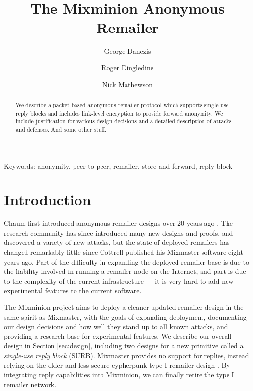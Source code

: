 \documentclass{llncs}
\begin{document}


\title{The Mixminion Anonymous Remailer}
\author{George Danezis \and Roger Dingledine \and Nick Mathewson}
\maketitle
\pagestyle{empty} 
  
\begin{abstract}

We describe a packet-based anonymous remailer protocol which supports
single-use reply blocks and includes link-level encryption to provide
forward anonymity. We include justification for various design decisions
and a detailed description of attacks and defenses. And some other stuff.

\end{abstract}

Keywords: anonymity, peer-to-peer, remailer, store-and-forward, reply block %


\section{Introduction}
\label{sec:intro}

Chaum first introduced anonymous remailer designs over 20 years ago
\cite{chaum-mix}. The research community has since introduced many new
designs and proofs, and discovered a variety of new attacks, but the
state of deployed remailers has changed remarkably little since Cottrell
published his Mixmaster software \cite{mixmaster-attacks} eight years
ago. Part of the difficulty in expanding the deployed remailer base is
due to the liability involved in running a remailer node on the Internet,
and part is due to the complexity of the current infrastructure ---
it is very hard to add new experimental features to the current software.

The Mixminion project aims to deploy a cleaner updated remailer design
in the same spirit as Mixmaster, with the goals of expanding deployment,
documenting our design decisions and how well they stand up to all known
attacks, and providing a research base for experimental features. We
describe our overall design in Section \ref{sec:design}, including two
designs for a new primitive called a \emph{single-use reply block}
(SURB).  Mixmaster provides no support for replies, instead relying
on the older and less secure cypherpunk type I remailer design
\cite{cypherpunk-remailer}. By integrating reply capabilities into
Mixminion, we can finally retire the type I remailer network.
\end{document}
